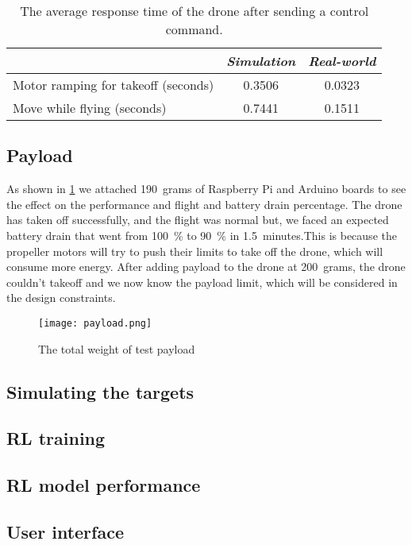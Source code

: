 \documentclass[../main.tex]{subfiles}
\begin{document}
\begin{table}[tbp]
	\centering
	\caption{The average response time of the drone after sending a control command.}
	\label{tab:respone-time}
	\begin{tabularx}{0.7\textwidth}{ X c c }
		\toprule
		\textit{} & \textit{Simulation} & \textit{Real-world}\\ \midrule
		Motor ramping for takeoff (seconds)  & 0.3506 & 0.0323     \\
		Move while flying (seconds) & 0.7441  & 0.1511   \\
		\bottomrule
	\end{tabularx}
\end{table} 

\subsection{Payload}

As shown in \cref{fig:payload}
we attached \SI{190}{grams} of Raspberry Pi and Arduino boards
to see the effect on the performance and flight and
battery drain percentage. 
The drone has taken off  successfully, 
and the flight was normal but, we faced an expected 
battery drain that went from 
\SI{100}{\percent} to \SI{90}{\percent} in 
\SI{1.5}{minutes}.This is because the propeller motors will try to push 
their limits to take off the drone, which will consume more energy.
After adding payload to the drone at \SI{200}{grams}, the drone couldn't
takeoff and we now know the payload limit, which will be considered in the 
design constraints.

\begin{figure}[bp]
	\centering
	\texttt{[image: payload.png]}
	\caption{The total weight of test payload}
	\label{fig:payload}
\end{figure} 



\subsection{Simulating the targets}

\lipsum[1]

\subsection{RL training}

\lipsum[1]

\subsection{RL model performance}

\lipsum[1]

\subsection{User interface}

\lipsum[1]
\end{document}
